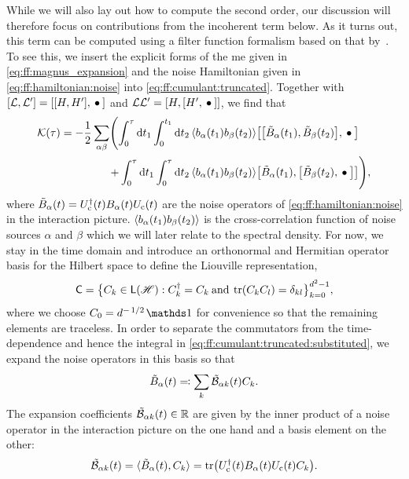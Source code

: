 While we will also lay out how to compute the second order, our discussion will therefore focus on contributions from the incoherent term below.
As it turns out, this term can be computed using a filter function formalism based on that by~\citet{Green2013}.
To see this, we insert the explicit forms of the \gls{me} given in \cref{eq:ff:magnus_expansion} and the noise Hamiltonian given in \cref{eq:ff:hamiltonian:noise} into \cref{eq:ff:cumulant:truncated}.
Together with $\comm{\mc{L}}{\mc{L}'} = \comm{\comm{H}{H'}}{\placeholder}$ and $\mc{L}\mc{L}' = \comm{H}{\comm{H'}{\placeholder}}$, we find that
\begin{align}
    \cumulantfun(\tau) = -\frac{1}{2}\sum_{\alpha\beta}\Biggl(\int_0^\tau\dd{t_1}\int_0^{t_1}\dd{t_2}
    \expval{b_\alpha(t_1) b_\beta(t_2)} & \comm{\comm{\tilde{B}_\alpha(t_1)}{\tilde{B}_\beta(t_2)}}{\placeholder} \notag\\
    +\int_0^\tau\dd{t_1}\int_0^\tau\dd{t_2}
    \expval{b_\alpha(t_1) b_\beta(t_2)} & \comm{\tilde{B}_\alpha(t_1)}{\comm{\tilde{B}_\beta(t_2)}{\placeholder}}\Biggr), \label{eq:ff:cumulant:truncated:substituted}
\end{align}
where $\tilde{B}_\alpha(t) = U_{\mathrm{c}}^\dagger(t)B_\alpha(t)U_{\mathrm{c}}(t)$ are the noise operators of \cref{eq:ff:hamiltonian:noise} in the interaction picture.
$\ev{b_\alpha(t_1)b_\beta(t_2)}$ is the cross-correlation function of noise sources $\alpha$ and $\beta$ which we will later relate to the spectral density.
For now, we stay in the time domain and introduce an orthonormal and Hermitian operator basis for the Hilbert space \Hspace to define the Liouville representation,
\begin{equation}\label{eq:ff:basis}
    \mathsf{C} = \bigl\lbrace C_k\in\mathsf{L}(\mathscr{H}): C_k^\dagger = C_k\:\text{and}\:\tr(C_k C_l) = \delta_{kl}\bigr\rbrace_{k=0}^{d^2-1},
\end{equation}
where we choose $C_0 = d^{-\flatfrac{1}{2}}\eye$ for convenience so that the remaining elements are traceless.
In order to separate the commutators from the time-dependence and hence the integral in \cref{eq:ff:cumulant:truncated:substituted}, we expand the noise operators in this basis so that
\begin{equation}\label{eq:ff:noise_operators:expanded}
\tilde{B}_\alpha(t) \eqqcolon \sum_k\tilde{\mathcal{B}}_{\alpha k}(t) C_k.
\end{equation}
The expansion coefficients $\tilde{\mathcal{B}}_{\alpha k}(t)\in\mathbb{R}$ are given by the inner product of a noise operator in the interaction picture on the one hand and a basis element on the other:
\begin{equation}\label{eq:ff:control_matrix}
\tilde{\mathcal{B}}_{\alpha k}(t) = \langle\tilde{B}_\alpha(t), C_k\rangle  = \tr(U_{\mathrm{c}}^\dagger(t)B_\alpha(t)U_{\mathrm{c}}(t)C_k).
\end{equation}
